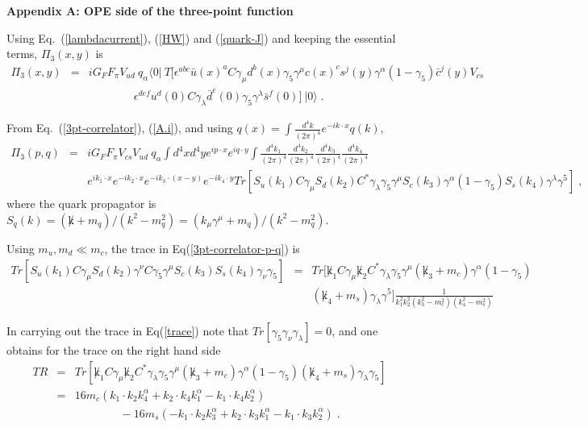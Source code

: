 \documentclass[twoside]{article}
\newcommand{\beq}{\begin{eqnarray}}
\newcommand{\eeq}{\end{eqnarray}}
\begin{document}
\begin{appendix}
\setcounter{equation}{0}
\renewcommand{\theequation}{A.\arabic{equation}}

\Large
{\bf Appendix A: OPE side of the three-point function}
\normalsize
\vspace{2mm}

Using Eq.~(\ref{lambdacurrent}), (\ref{HW}) and (\ref{quark-J}) and keeping the
 essential terms, $\Pi_3(x,y)$ is
\beq
\label{A.1}
 \Pi_3(x,y)&=& iG_F F_\pi V_{ud}~ q_\alpha \langle 0 \vert ~T 
\Big[\epsilon^{abc}\bar{u}(x)^a 
C\gamma_\mu d^b(x) \gamma_5 \gamma^\mu c(x)^c s^j(y) \gamma^\alpha(1-\gamma_5) 
\bar{c}^j(y) V_{cs} \nonumber \\
  && \qquad \qquad \epsilon^{def} u^d(0)C  \gamma_\lambda \bar{d}^e(0) 
\gamma_5 \gamma^\lambda \bar{s}^f (0) \Big]~\vert 0 \rangle \; .
\eeq

\noindent
From Eq.~(\ref{3pt-correlator}), (\ref{A.i}), and using $q(x)=\int 
\frac{d^4 k}{(2\pi)^4} e^{-ik \cdot x}q(k)$,
\beq
\label{3pt-correlator-p-q}
\Pi_3(p,q) &=& iG_F F_\pi V_{cs}V_{ud} ~q_\alpha \int d^4x d^4y 
e^{ip\cdot x} e^{iq \cdot y} \int \frac{d^4 k_1}{(2\pi)^4}\frac{d^4 k_2}
{(2\pi)^4} \frac{d^4 k_3}{(2\pi)^4} \frac{d^4 k_4}{(2\pi)^4}  \\
 &&e^{ik_1 \cdot x}e^{-ik_2 \cdot x}e^{-ik_3 \cdot (x-y)}e^{-ik_4 \cdot y}
Tr[S_u(k_1) C\gamma_\mu S_d(k_2) C^* \gamma_\lambda \gamma_5 \gamma^\mu  
S_c(k_3) \gamma^\alpha (1-\gamma_5) S_s(k_4)\gamma^\lambda \gamma^5] \nonumber
 \; ,
\eeq 
where the quark propagator is $S_q(k)=(\not k+m_q)/(k^2-m_q^2)=
 (k_\mu \gamma^\mu+m_q)/(k^2-m_q^2)$.

\noindent
Using $m_u,m_d \ll m_c$, the trace in Eq(\ref{3pt-correlator-p-q}) is
\beq
\label{trace}
Tr[S_u(k_1)C\gamma_\mu S_d(k_2)\gamma^\nu C\gamma_5 \gamma^\mu S_c(k_3)
S_s(k_4)\gamma_\nu \gamma_5]&=& Tr[\not k_1 C\gamma_\mu \not k_2 C^* 
\gamma_\lambda \gamma_5 \gamma^\mu (\not k_3 +m_c) \gamma^\alpha (1-\gamma_5)
 \nonumber\\
&&(\not k_4 +m_s) \gamma_\lambda \gamma^5]\frac{1}{k_1^2 k_2^2 (k_3^2-m_c^2)
(k_4^2-m_s^2)}
\eeq

\noindent
In carrying out the trace in Eq(\ref{trace}) note that $Tr[\gamma_5 \gamma_\nu
\gamma_\lambda] = 0$, and one obtains for the trace on the right hand side
\beq
\label{trace2} 
TR &=& Tr[\not k_1 C\gamma_\mu 
\not k_2 C^* \gamma_\lambda \gamma_5 \gamma^\mu (\not k_3 +m_c) \gamma^\alpha 
(1-\gamma_5) (\not k_4 +m_s) \gamma_\lambda \gamma_5] \nonumber\\
&=& 16 m_c (k_1\cdot k_2 k_4^\alpha +k_2\cdot k_4 k_1^\alpha -k_1\cdot k_4 
k_2^\alpha) \nonumber \\
&&\qquad \qquad 
-16 m_s (-k_1\cdot k_2 k_3^\alpha +
k_2\cdot k_3 k_1^\alpha -k_1\cdot k_3 k_2^\alpha) \; .
\eeq


\end{appendix}
\end{document}
